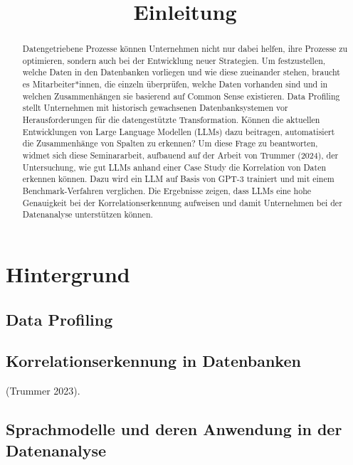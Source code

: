 \documentclass[
  11pt,
]{report}
\title{Einleitung}
\author{}
\date{}
\renewcommand*\contentsname{Table of contents}
\newcommand\contentsname{Table of contents}
\begin{document}
\maketitle
\begin{abstract}
Datengetriebene Prozesse können Unternehmen nicht nur dabei helfen, ihre
Prozesse zu optimieren, sondern auch bei der Entwicklung neuer
Strategien. Um festzustellen, welche Daten in den Datenbanken vorliegen
und wie diese zueinander stehen, braucht es Mitarbeiter*innen, die
einzeln überprüfen, welche Daten vorhanden sind und in welchen
Zusammenhängen sie basierend auf Common Sense existieren. Data Profiling
stellt Unternehmen mit historisch gewachsenen Datenbanksystemen vor
Herausforderungen für die datengestützte Transformation. Können die
aktuellen Entwicklungen von Large Language Modellen (LLMs) dazu
beitragen, automatisiert die Zusammenhänge von Spalten zu erkennen? Um
diese Frage zu beantworten, widmet sich diese Seminararbeit, aufbauend
auf der Arbeit von Trummer (2024), der Untersuchung, wie gut LLMs anhand
einer Case Study die Korrelation von Daten erkennen können. Dazu wird
ein LLM auf Basis von GPT-3 trainiert und mit einem Benchmark-Verfahren
verglichen. Die Ergebnisse zeigen, dass LLMs eine hohe Genauigkeit bei
der Korrelationserkennung aufweisen und damit Unternehmen bei der
Datenanalyse unterstützen können.
\end{abstract}

\renewcommand*\contentsname{Table of contents}
{
\hypersetup{linkcolor=}
\setcounter{tocdepth}{2}
\tableofcontents
}
\listoffigures
\listoftables
{}
\chapter{Hintergrund}\label{hintergrund}

\section{Data Profiling}\label{data-profiling}

\section{Korrelationserkennung in
Datenbanken}\label{korrelationserkennung-in-datenbanken}

(Trummer 2023).

\section{Sprachmodelle und deren Anwendung in der
Datenanalyse}\label{sprachmodelle-und-deren-anwendung-in-der-datenanalyse}
\end{document}
